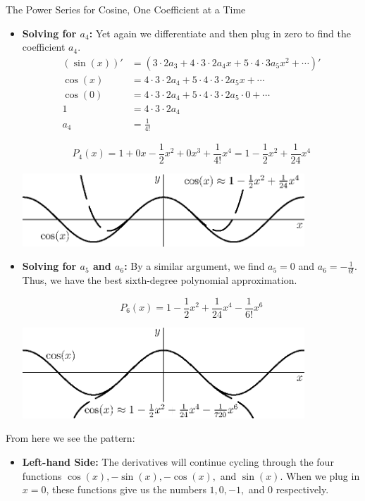 \begin{example}{The Power Series for Cosine, One Coefficient at a Time}
\begin{itemize}
\item {\bf Solving for $a_4$:}  Yet again we differentiate and then plug in zero to find the coefficient $a_4$.
\begin{align*}
\left(\sin(x)\right)'&=\left(3\cdot 2a_3+4\cdot 3 \cdot 2 a_4x+5\cdot 4 \cdot 3 a_5 x^2+\cdots \right)' \\
\cos(x)&=4\cdot 3\cdot 2 a_4+5\cdot 4 \cdot 3 \cdot 2 a_5 x+ \cdots \\
\cos(0)&=4\cdot 3\cdot 2 a_4+5\cdot 4 \cdot 3 \cdot 2 a_5 \cdot 0+ \cdots \\
1&=4\cdot 3\cdot 2a_4 \\
a_4&=\frac{1}{4!} 
\end{align*}

 $$P_4(x)=1+0x-\frac{1}{2}x^2+0x^3+\frac{1}{4!}x^4 =1-\frac{1}{2}x^2+\frac{1}{24}x^4$$

	\begin{center}
		\includegraphics[width=300pt]{ChapterPowerSeries/Figures/cosdeg4.eps}
	\end{center}
\item {\bf Solving for $a_5$ and $a_6$:}  By a similar argument, we find $a_5=0$ and $a_6=-\frac{1}{6!}$.  Thus, we have the best sixth-degree polynomial approximation.

 $$P_6(x)=1-\frac{1}{2}x^2+\frac{1}{24}x^4-\frac{1}{6!}x^6$$
 
	\begin{center}
		\includegraphics[width=300pt]{ChapterPowerSeries/Figures/cosdeg6.eps}
	\end{center}

\end{itemize}

From here we see the pattern: 
\begin{itemize}
\item {\bf Left-hand Side:} The derivatives will continue cycling through the four functions $\cos(x), -\sin(x), -\cos(x), $ and $\sin(x)$.  When we plug in $x=0$, these functions give us the numbers $1, 0, -1,$ and 0 respectively.


\end{itemize}
\end{example}
